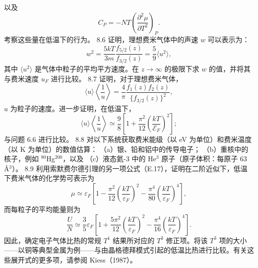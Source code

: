 以及
\begin{equation}\tag{8.5.2}\label{eq:8.5.2}
C _ { P } = - N T \left( \frac { \partial ^{2} \mu } { \partial T ^{2} } \right) _ { P } .
\end{equation}
考察这些量在低温下的行为。
8.6 证明，理想费米气体中的声速 \(w\) 可以表示为：
\begin{equation}\tag{8.6.16}\label{eq:8.6.16}
w ^{2} = \frac { 5 k T } { 3 m } \frac { f _ { 5 / 2 } ( z ) } { f _ { 3 / 2 } ( z ) } = \frac { 5 } { 9 } \langle u ^{2} \rangle ,
\end{equation}
其中 \(\langle u^{2}\rangle\) 是气体中粒子的平均平方速度。在 \(z\to\infty\) 的极限下求 \(w\) 的值，并将其与费米速度 \(u_{F}\) 进行比较。
8.7 证明，对于理想费米气体，
\begin{equation}\tag{8.7.1}\label{eq:8.7.1}
\langle u \rangle \left\langle \frac { 1 } { u } \right\rangle = \frac { 4 } { \pi } \frac { f _ { 1 } ( z ) f _ { 2 } ( z ) } { \{ f _ { 3 / 2 } ( z ) \} ^{2} } ,
\end{equation}
\(u\) 为粒子的速度。进一步证明，在低温下，
\begin{equation}\tag{8.7.2}\label{eq:8.7.2}
\langle u \rangle \left\langle \frac { 1 } { u } \right\rangle \simeq \frac { 9 } { 8 } \left[ 1 + \frac { \pi ^{2} } { 12 } \left( \frac { k T } { \mathcal { E } _ { F } } \right) ^{2} \right] ;
\end{equation}
与问题 6.6 进行比较。
8.8 对以下系统获取费米能级（以 eV 为单位）和费米温度（以 K 为单位）的数值估算：
（a）银、铅和铝中的传导电子；
（b）重核中的核子，例如 \(^{80}\)Hg\(^{200}\)，以及
（c）液态氦-3 中的 He\(^{3}\) 原子（原子体积：每原子 63 Å\(^{3}\)）。
8.9 利用索默费尔德引理的另一项公式（E.17），证明在二阶近似下，低温下费米气体的化学势可表示为
\begin{equation}\tag{8.9.1}\label{eq:8.9.1}
\mu \simeq \varepsilon _ { F } \left[ 1 - \frac { \pi ^{2} } { 12 } \left( \frac { k T } { \varepsilon _ { F } } \right) ^{2} - \frac { \pi ^{4} } { 80 } \left( \frac { k T } { \varepsilon _ { F } } \right) ^{4} \right] ,
\end{equation}
而每粒子的平均能量则为
\begin{equation}\tag{8.9.2}\label{eq:8.9.2}
\frac { U } { N } \simeq \frac { 3 } { 5 } \varepsilon _ { F } \left[ 1 + \frac { 5 \pi ^{2} } { 12 } \left( \frac { k T } { \varepsilon _ { F } } \right) ^{2} - \frac { \pi ^{4} } { 16 } \left( \frac { k T } { \varepsilon _ { F } } \right) ^{4} \right] .
\end{equation}
因此，确定电子气体比热的常规 \(T^{1}\) 结果所对应的 \(T^{3}\) 修正项。将该 \(T^{3}\) 项的大小——以铜等典型金属为例——与由晶格德拜模式引起的低温比热进行比较。有关这些展开式的更多项，请参阅 Kiess（1987）。
